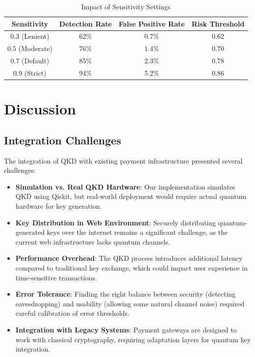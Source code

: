 \documentclass[conference]{IEEEtran}
\begin{document}
\begin{table}[h]
\centering
\begin{tabular}{|c|c|c|c|}
\hline
\textbf{Sensitivity} & \textbf{Detection Rate} & \textbf{False Positive Rate} & \textbf{Risk Threshold} \\
\hline
0.3 (Lenient) & 62\% & 0.7\% & 0.62 \\
\hline
0.5 (Moderate) & 76\% & 1.4\% & 0.70 \\
\hline
0.7 (Default) & 85\% & 2.3\% & 0.78 \\
\hline
0.9 (Strict) & 94\% & 5.2\% & 0.86 \\
\hline
\end{tabular}
\caption{Impact of Sensitivity Settings}
\label{tab:sensitivity_impact}
\end{table}

\section{Discussion}

\subsection{Integration Challenges}
The integration of QKD with existing payment infrastructure presented several challenges:

\begin{itemize}
    \item \textbf{Simulation vs. Real QKD Hardware}: Our implementation simulates QKD using Qiskit, but real-world deployment would require actual quantum hardware for key generation.
    
    \item \textbf{Key Distribution in Web Environment}: Securely distributing quantum-generated keys over the internet remains a significant challenge, as the current web infrastructure lacks quantum channels.
    
    \item \textbf{Performance Overhead}: The QKD process introduces additional latency compared to traditional key exchange, which could impact user experience in time-sensitive transactions.
    
    \item \textbf{Error Tolerance}: Finding the right balance between security (detecting eavesdropping) and usability (allowing some natural channel noise) required careful calibration of error thresholds.
    
    \item \textbf{Integration with Legacy Systems}: Payment gateways are designed to work with classical cryptography, requiring adaptation layers for quantum key integration.
\end{itemize}
\end{document}
